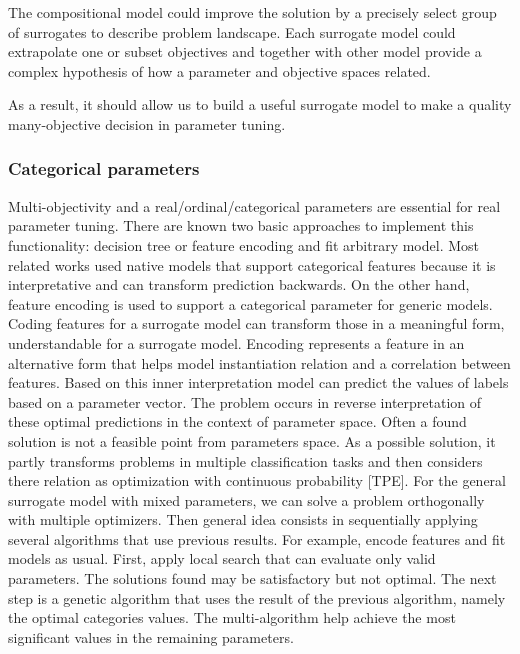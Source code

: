                 The compositional model could improve the solution by a precisely select group of surrogates to describe problem landscape. Each surrogate model could extrapolate one or subset objectives and together with other model provide a complex hypothesis of how a parameter and objective spaces related.

                As a result, it should allow us to build a useful surrogate model to make a quality many-objective decision in parameter tuning. 

            \subsubsection{Categorical parameters} Multi-objectivity and a real/ordinal/categorical parameters are essential for real parameter tuning. There are known two basic approaches to implement this functionality: decision tree or feature encoding and fit arbitrary model. Most related works used native models that support categorical features because it is interpretative and can transform prediction backwards. 
            On the other hand, feature encoding is used to support a categorical parameter for generic models. Coding features for a surrogate model can transform those in a meaningful form, understandable for a surrogate model. Encoding represents a feature in an alternative form that helps model instantiation relation and a correlation between features. Based on this inner interpretation model can predict the values of labels based on a parameter vector. The problem occurs in reverse interpretation of these optimal predictions in the context of parameter space. Often a found solution is not a feasible point from parameters space. As a possible solution, it partly transforms problems in multiple classification tasks and then considers there relation as optimization with continuous probability [TPE]. 
            For the general surrogate model with mixed parameters, we can solve a problem orthogonally with multiple optimizers.  Then general idea consists in sequentially applying several algorithms that use previous results. For example, encode features and fit models as usual. First, apply local search that can evaluate only valid parameters. The solutions found may be satisfactory but not optimal.  The next step is a genetic algorithm that uses the result of the previous algorithm, namely the optimal categories values. The multi-algorithm help achieve the most significant values in the remaining parameters. 

